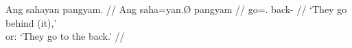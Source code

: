 \a\begingl
	\gla Ang sahayan pangyam. //
	\glb Ang saha=yan.Ø pangyam //
	\glc \AgtT{} go=\Tpl{}.\Top{} back-\Dat{} //
	\glft `They go behind (it),'\\
		or: `They go to the back.' //
\endgl

\xe

% 
% 
% 
% 
% 
% 
% 
% 

